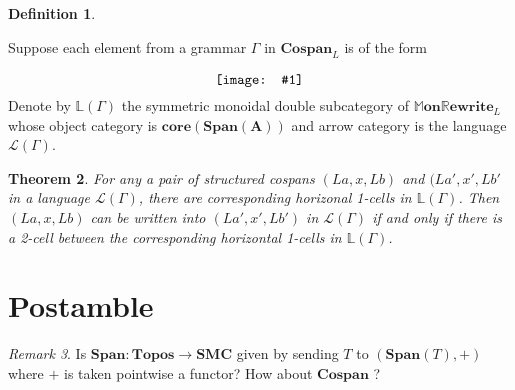 \documentclass{amsart}
\newcommand{\LL}{\mathbb{L}}
\newcommand{\A}{\cat{A}}
\newcommand{\core}{\mathbf{core}}
\newcommand{\cat}[1]{\mathbf{#1}}
\newcommand{\from}{\colon}
\newcommand{\diagram}[1]{\raisebox{-0.5\height}{\texttt{[image: \#1]}}}
\newcommand{\Span}{\mathbf{Span}}
\newcommand{\Cospan}{\mathbf{Cospan}}
\newcommand{\MMonRewrite}{ \mathbb{M}\mathbf{on}\mathbb{R}\mathbf{ewrite} }
\newtheorem{theorem}{Theorem}[section]
\theoremstyle{remark}
\newtheorem{remark}[theorem]{Remark}
\theoremstyle{definition}
\newtheorem{definition}[theorem]{Definition}
\begin{document}
\begin{definition} \label{df:gramr-gen-dbl-cat}
	
  Suppose each element from a grammar $ \Gamma $ in $ \Cospan_{L} $ is
  of the form
  \[
    \diagram{diag_lr-grammar-2cell}
  \]
  Denote by $ \LL ( \Gamma ) $ the symmetric monoidal double
  subcategory of $ \MMonRewrite_{L} $ whose object category is
  \( \core ( \Span ( \A ) ) \) and arrow category is the language
  $ \mathcal{L} ( \Gamma ) $.
        
\end{definition}


\begin{theorem}
  
  For any a pair of structured cospans \( (La,x,Lb) \) and
  \( (La',x',Lb' \) in a language \( \mathcal{L} (\Gamma) \), there
  are corresponding horizonal 1-cells in \( \LL (\Gamma) \). Then
  \( (La,x,Lb) \) can be written into \( (La',x',Lb') \) in
  \( \mathcal{L} (\Gamma) \) if and only if there is a 2-cell between
  the corresponding horizontal 1-cells in \( \LL (\Gamma) \).
  
\end{theorem}


\section{Postamble} \label{sec:postable}


\begin{remark}
  Is \( \Span \from \cat{Topos} \to \cat{SMC}
  \) given by sending \( T \) to \( (\Span (T),+) \) where \( + \) is
  taken pointwise a functor?  How about \( \Cospan \) ?
\end{remark}




\end{document}

